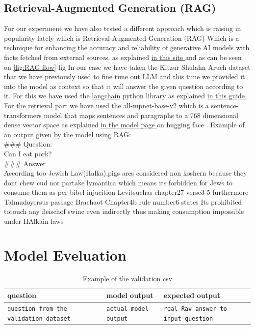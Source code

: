 \documentclass[11pt]{article}
\begin{document}
\subsection{Retrieval-Augmented Generation (RAG)}
For our experiment we have also tested a different approach which is raising in popularity lately which is Retrieval-Augmented Generation (RAG) Which is a technique for enhancing the accuracy and reliability of generative AI models with facts fetched from external sources. as explained \href{https://www.databricks.com/glossary/retrieval-augmented-generation-rag#:~:text=An%20easy%20and%20popular%20way,augmented%20context%20for%20the%20LLM. }{in this site } and as can be seen on \ref{fig:RAG flow} fig
In our case we have taken the Kitzur Shulahn Aruch dataset that we have previously used to fine tune out LLM and this time we provided it into the model as context so that it will answer the given question according to it.  
For this we have used the \href{https://python.langchain.com/v0.1/docs/get_started/introduction/}{langchain} python library as explained \href{https://www.kaggle.com/code/gpreda/rag-using-llama-2-langchain-and-chromadb/notebook#Retrieval-Augmented-Generation }{in this guide }.
For the retrieval part we have used the all-mpnet-base-v2 which is a sentence-transformers model that maps sentences and paragraphs to a 768 dimensional dense vector space as explained  \href{https://huggingface.co/sentence-transformers/all-mpnet-base-v2 }{in the model page } on hugging face .
Example of an output given by the model using RAG:\\
\#\#\# Question: \\
    Can I eat pork?\\
\#\#\# Answer \\
According  too Jewish Law(Halka),pigs
ares considered non koshern because
they dont chew cud nor partake 
lymantica which means its forbidden
for Jews to consume them as per bibel
injucition Levitsuchas chapter27
verse3-5 furthermore Talmudoyersus
passage Brachaot Chapter4b rule number6
states Its prohibited totouch any fleischof
swine even indirectly thus making 
consumption impossible under HAlkain laws



\section{Model Eveluation}

\begin{table}
\centering
\begin{tabular}{lll}
\hline
\textbf{question} & \textbf{model output} & \textbf{expected output}\\
\hline
\verb|question from the validation dataset| & \verb|actual model output| & \verb|real Rav answer to input question| \\
\hline
\end{tabular}
\caption{\label{validation csv example}
Example of the validation csv 
}
\end{table}
\end{document}
